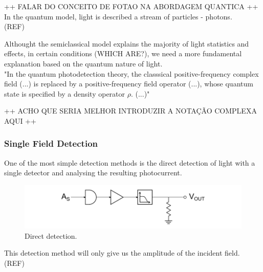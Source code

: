 \begin{bibunit}[plain]
++ FALAR DO CONCEITO DE FOTAO NA ABORDAGEM QUANTICA ++\\

In the quantum model, light is described a stream of particles - photons.\\
(REF)

Althought the semiclassical model explains the majority of light statistics and effects, in certain conditions (WHICH ARE?), we need a more fundamental explanation based on  the quantum nature of light.\\

"In the quantum photodetection theory, the classsical positive-frequency complex field (...) is replaced by a positive-frequency field operator (...), whose quantum state is specified by a density operator $\rho$. (...)"\\
\cite{shapiro1985quantum} %



++ ACHO QUE SERIA MELHOR INTRODUZIR A NOTAÇÃO COMPLEXA AQUI ++\\



\subsubsection{Single Field Detection}

One of the most simple detection methods is the direct detection of light with a single detector and analysing the resulting photocurrent.
\cite{hans2004} %
%
\begin{figure}[H]
	\label{fig:detection_direct}
	\centering
	\includegraphics{./sdf/optical_detection/figures/detection-direct.pdf}
	\caption{Direct detection.}
\end{figure}


This detection method will only give us the amplitude of the incident field. (REF)\\



\end{bibunit}
